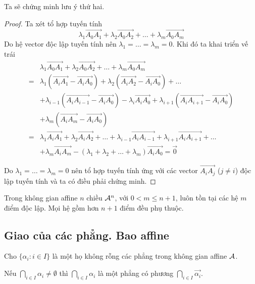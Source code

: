 Ta sẽ chứng minh lưu ý thứ hai.

\begin{proof}
	Ta xét tổ hợp tuyến tính \[\lambda_1 \overrightarrow{A_0 A_1} + \lambda_2 \overrightarrow{A_0 A_2} + \ldots + \lambda_m \overrightarrow{A_0 A_m}\]
	Do hệ vector độc lập tuyến tính nên $\lambda_1 = \ldots = \lambda_m = 0$. Khi đó ta khai triển vế trái
	\begin{align*}
		& \lambda_1 \overrightarrow{A_0 A_1} + \lambda_2 \overrightarrow{A_0 A_2} + \ldots + \lambda_m \overrightarrow{A_0 A_m} \\ = & \lambda_1 (\overrightarrow{A_i A_1} - \overrightarrow{A_i A_0}) + \lambda_2 (\overrightarrow{A_i A_2} - \overrightarrow{A_i A_0}) + \ldots \\ & + \lambda_{i-1} (\overrightarrow{A_i A_{i-1}} - \overrightarrow{A_i A_0}) - \lambda_i \overrightarrow{A_i A_0} + \lambda_{i+1} (\overrightarrow{A_i A_{i+1}} - \overrightarrow{A_i A_0}) \\ & + \lambda_m (\overrightarrow{A_i A_m} - \overrightarrow{A_i A_0}) \\ = & \lambda_1 \overrightarrow{A_i A_1} + \lambda_2 \overrightarrow{A_i A_2} + \ldots + \lambda_{i-1} \overrightarrow{A_i A_{i-1}} + \lambda_{i+1} \overrightarrow{A_i A_{i+1}} + \ldots \\ & + \lambda_m \overrightarrow{A_i A_m} - (\lambda_1 + \lambda_2 + \ldots + \lambda_m) \overrightarrow{A_i A_0} = \overrightarrow{0}
	\end{align*}
	
	Do $\lambda_1 = \ldots = \lambda_m = 0$ nên tổ hợp tuyến tính ứng với các vector $\overrightarrow{A_i A_j}$ ($j \neq i$) độc lập tuyến tính và ta có điều phải chứng minh.
\end{proof}

\begin{theorem}
	Trong không gian affine $n$ chiều $\mathcal{A}^n$, với $0 < m \leq n+1$, luôn tồn tại các hệ $m$ điểm độc lập. Mọi hệ gồm hơn $n+1$ điểm đều phụ thuộc.
\end{theorem}

\subsection*{Giao của các phẳng. Bao affine}

Cho $\{\alpha_i: i \in I\}$ là một họ không rỗng các phẳng trong không gian affine $\mathcal{A}$.

\begin{theorem}
	Nếu $\displaystyle{\bigcap_{i \in I} \alpha_i \neq \emptyset}$ thì $\displaystyle{\bigcap_{i \in I} \alpha_i}$ là một phẳng có phương $\displaystyle{\bigcap_{i \in I}\overrightarrow{\alpha_i}}$.
	\label{theorem2}
\end{theorem}

